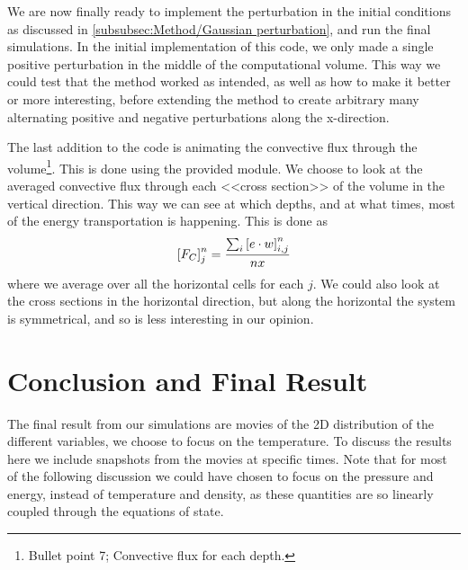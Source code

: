 \documentclass[11pt,a4paper,twocolumn,titlepage]{article}
\begin{document}
We are now finally ready to implement the perturbation in the initial conditions as discussed in \ref{subsubsec:Method/Gaussian perturbation}, and run the final simulations. In the initial implementation of this code, we only made a single positive perturbation in the middle of the computational volume. This way we could test that the method worked as intended, as well as how to make it better or more interesting, before extending the method to create arbitrary many alternating positive and negative perturbations along the x-direction.

The last addition to the code is animating the convective flux through the volume\footnote{Bullet point 7; Convective flux for each depth.}. This is done using the provided module. We choose to look at the averaged convective flux through each <<cross section>> of the volume in the vertical direction. This way we can see at which depths, and at what times, most of the energy transportation is happening. This is done as
\begin{equation}
\qty[F_C]_{j}^{n} = \frac{\sum_i \qty[e\cdot w]_{i,j}^{n}}{nx}
\label{eq:FC_j}
\end{equation}
where we average over all the horizontal cells for each $j$. We could also look at the cross sections in the horizontal direction, but along the horizontal the system is symmetrical, and so is less interesting in our opinion.

\section{Conclusion and Final Result}\label{sec:Conclusion}
The final result from our simulations are movies
 of the 2D distribution of the different variables, we choose to focus on the temperature. To discuss the results here we include snapshots from the movies at specific times. Note that for most of the following discussion we could have chosen to focus on the pressure and energy, instead of temperature and density, as these quantities are so linearly coupled through the equations of state. 
\end{document}
